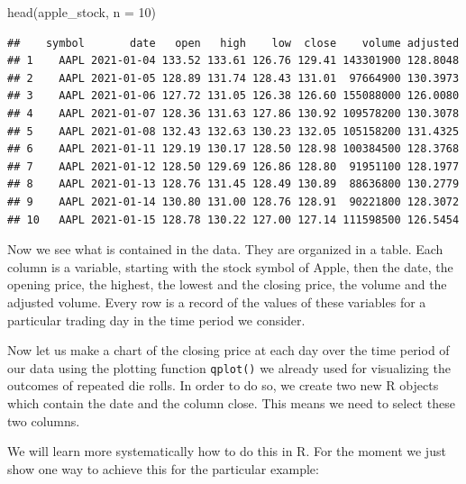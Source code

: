 \documentclass[
]{book}
\newenvironment{Shaded}{\begin{snugshade}}{\end{snugshade}}
\newcommand{\AttributeTok}[1]{\textcolor[rgb]{0.77,0.63,0.00}{#1}}
\newcommand{\DecValTok}[1]{\textcolor[rgb]{0.00,0.00,0.81}{#1}}
\newcommand{\FunctionTok}[1]{\textcolor[rgb]{0.00,0.00,0.00}{#1}}
\newcommand{\NormalTok}[1]{#1}
\newcommand{\OtherTok}[1]{\textcolor[rgb]{0.56,0.35,0.01}{#1}}
\newcommand{\SpecialCharTok}[1]{\textcolor[rgb]{0.00,0.00,0.00}{#1}}
\begin{document}
\begin{Shaded}
\begin{Highlighting}[]
\FunctionTok{head}\NormalTok{(apple\_stock, }\AttributeTok{n =} \DecValTok{10}\NormalTok{)}
\end{Highlighting}
\end{Shaded}

\begin{verbatim}
##    symbol       date   open   high    low  close    volume adjusted
## 1    AAPL 2021-01-04 133.52 133.61 126.76 129.41 143301900 128.8048
## 2    AAPL 2021-01-05 128.89 131.74 128.43 131.01  97664900 130.3973
## 3    AAPL 2021-01-06 127.72 131.05 126.38 126.60 155088000 126.0080
## 4    AAPL 2021-01-07 128.36 131.63 127.86 130.92 109578200 130.3078
## 5    AAPL 2021-01-08 132.43 132.63 130.23 132.05 105158200 131.4325
## 6    AAPL 2021-01-11 129.19 130.17 128.50 128.98 100384500 128.3768
## 7    AAPL 2021-01-12 128.50 129.69 126.86 128.80  91951100 128.1977
## 8    AAPL 2021-01-13 128.76 131.45 128.49 130.89  88636800 130.2779
## 9    AAPL 2021-01-14 130.80 131.00 128.76 128.91  90221800 128.3072
## 10   AAPL 2021-01-15 128.78 130.22 127.00 127.14 111598500 126.5454
\end{verbatim}

Now we see what is contained in the data. They are organized in a table. Each column is a
variable, starting with the stock symbol of Apple, then the date, the opening price, the
highest, the lowest and the closing price, the volume and the adjusted volume. Every
row is a record of the values of these variables for a particular trading day in
the time period we consider.

Now let us make a chart of the closing price at each day over the time period of our data using
the plotting function \texttt{qplot()} we already used for visualizing the outcomes of
repeated die rolls. In order to do so, we create two new R objects which contain the date
and the column close. This means we need to select these two columns.

We
will learn more systematically how to do this in R. For the moment we just show one
way to achieve this for the particular example:

\begin{Shaded}
\end{Shaded}
\end{document}

